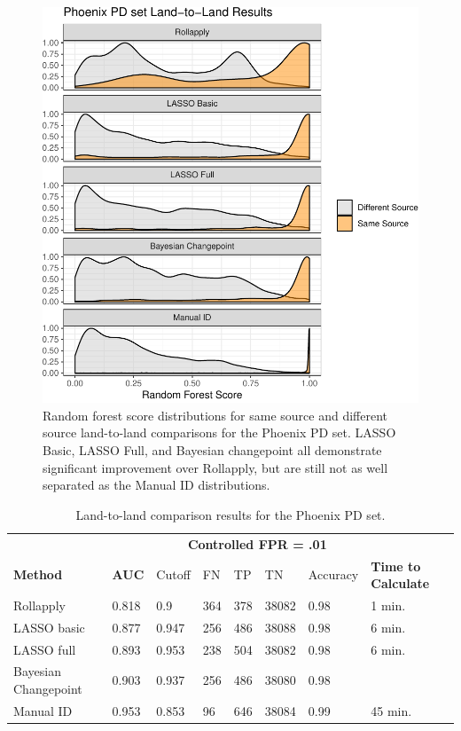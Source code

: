 \documentclass[12pt]{article}
\begin{document}
\begin{figure}
\centering
\includegraphics{writeup_files/figure-latex/phoenix-groove-results-1.pdf}
\caption{\label{phoenix-groove-results}Random forest score distributions
for same source and different source land-to-land comparisons for the
Phoenix PD set. LASSO Basic, LASSO Full, and Bayesian changepoint all
demonstrate significant improvement over Rollapply, but are still not as
well separated as the Manual ID distributions.}
\end{figure}

\begin{table}[]
\centering
\begin{tabular}{llllllll}
& & \multicolumn{5}{c}{\textbf{Controlled FPR = .01}} & \\
\textbf{Method} & \textbf{AUC} & Cutoff & FN &TP & TN & Accuracy & \textbf{Time to Calculate} \\ \hline
Rollapply & 0.818 &  0.9 & 364 & 378&38082 & 0.98& 1 min. \\ \hline
LASSO basic & 0.877 &  0.947 &256 & 486&38088 & 0.98 & 6 min. \\ \hline
LASSO full & 0.893 &  0.953 &238 &504 &38082 & 0.98  & 6 min. \\ \hline
Bayesian Changepoint & 0.903 &  0.937 &256 & 486&38080 & 0.98 &  \\ \hline
Manual ID & 0.953 &  0.853 & 96& 646&38084 & 0.99 & 45 min. \\ \hline 
\end{tabular}
\caption{Land-to-land comparison results for the Phoenix PD set.}
\label{phoenix-table}
\end{table}
\end{document}
